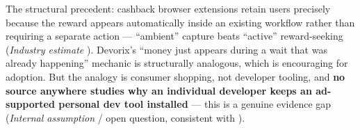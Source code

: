 The structural precedent: cashback browser extensions retain users precisely because the reward appears automatically inside an existing workflow rather than requiring a separate action --- ``ambient'' capture beats ``active'' reward-seeking (\emph{Industry estimate} \cite{wildfire_cashback_2026}). Devorix's ``money just appears during a wait that was already happening'' mechanic is structurally analogous, which is encouraging for adoption. But the analogy is consumer shopping, not developer tooling, and \textbf{no source anywhere studies why an individual developer keeps an ad-supported personal dev tool installed} --- this is a genuine evidence gap (\emph{Internal assumption} / open question, consistent with \cite{masterplan_2026}).

